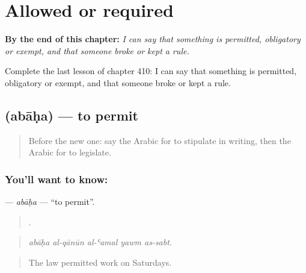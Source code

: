 
\chapter{Allowed or required}
\label{ch:ar-allowed-or-required}

\begin{chapteropening}
\textbf{By the end of this chapter:} \emph{I can say that something is permitted, obligatory or exempt, and that someone broke or kept a rule.}

Complete the last lesson of chapter 410: I can say that something is permitted, obligatory or exempt, and that someone broke or kept a rule.
\end{chapteropening}

\section[\texorpdfstring{\ar{أباح} (abāḥa)}{أباح (abāḥa)}]{ (abāḥa) — to permit}

\label{lesson:AR-C410-abaha}



\begin{quote}
Before the new one: say the Arabic for to stipulate in writing, then the Arabic for to legislate.
\end{quote}

\subsection*{You'll want to know: }
\textbf{} — \emph{abāḥa} — \textquotedblleft{}to permit\textquotedblright{}.

\begin{quote}
    .
\end{quote}

\begin{quote}
\emph{abāḥa al-qānūn al-ʿamal yawm as-sabt.}
\end{quote}

\begin{quote}
The law permitted work on Saturdays.
\end{quote}

